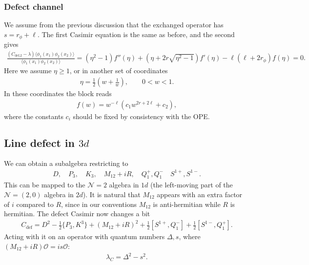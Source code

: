 \documentclass[letterpaper]{article}
\let\Oldsubsection\subsection
\renewcommand{\subsection}{\FloatBarrier\Oldsubsection}
\let\Oldsubsubsection\subsubsection
\renewcommand{\subsubsection}{\FloatBarrier\Oldsubsubsection}
\def\Nm{{\mathcal{N}}}
\def\Om{{\mathcal{O}}}
\begin{document}
\subsubsection{Defect channel}

We assume from the previous discussion that the exchanged operator has $s = r_\phi + \ell$. 
The first Casimir equation is the same as before, and the second gives
\begin{align}
 \frac{(C_{\text{def,2}} - \lambda) \langle \phi_1(x_1) \phi_2(x_2) \rangle}
      {\langle \phi_1(x_1) \phi_2(x_2) \rangle}
 = (\eta^2 - 1) f''(\eta) 
 + (\eta + 2r \sqrt{\eta^2-1}) f'(\eta)
 - \ell(\ell + 2 r_\phi) f(\eta)
 = 0.
\end{align}
Here we assume $\eta \ge 1$, or in another set of coordinates
\begin{align}
 \eta = \frac{1}{2} \left( w + \frac{1}{w} \right), \qquad
 0 < w < 1.
\end{align}
In these coordinates the block reads
\begin{align}
 f(w) = w^{-\ell} \left( c_1 w^{2r+2\ell} + c_2 \right),
\end{align}
where the constants $c_i$ should be fixed by consistency with the OPE.



\subsection{Line defect in \texorpdfstring{$3d$}{3d}}

We can obtain a subalgebra restricting to
\begin{align}
 D, \quad
 P_3, \quad
 K_3, \quad
 M_{12} + iR, \quad
 Q^+_1, Q^-_1 \quad
 S^{1+}, S^{1-}.
\end{align}
This can be mapped to the $\Nm = 2$ algebra in $1d$ (the left-moving part of the $\Nm = (2,0)$ algebra in $2d$).
It is natural that $M_{12}$ appears with an extra factor of $i$ compared to $R$, since in our conventions $M_{12}$ is anti-hermitian while $R$ is hermitian.
The defect Casimir now changes a bit
\begin{align}
 C_{\text{def}} = 
    D^2
  - \frac12 \{ P_{3}, K^{3} \}
  + (M_{12} + iR)^2
  + \frac12 [ S^{1+}, Q^-_1]
  + \frac12 [ S^{1-}, Q^+_1].
\end{align}
Acting with it on an operator with quantum numbers $\Delta, s$, where $(M_{12}+iR)\Om = i s \Om$:
\begin{align}
 \lambda_C 
 = \Delta^2
 - s^2.
\end{align}
\end{document}

